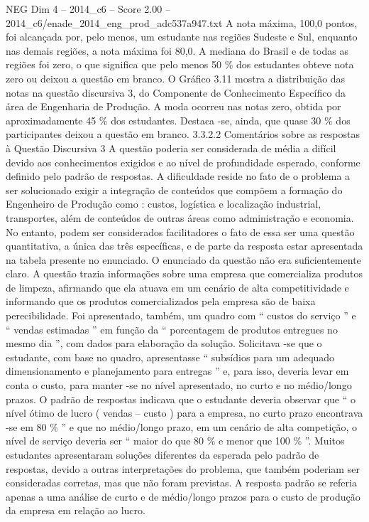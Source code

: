 \begin{textsample}{NEG Dim 4 – 2014\_c6 – Score 2.00 – 2014\_c6/enade\_2014\_eng\_prod\_adc537a947.txt}
A nota máxima, 100,0 pontos, foi alcançada por, pelo menos, um estudante nas regiões Sudeste e Sul, enquanto nas demais regiões, a nota máxima foi 80,0.
A mediana do Brasil e de todas as regiões foi zero, o que significa que pelo menos 50 \% dos estudantes obteve nota zero ou deixou a questão em branco.
O Gráfico 3.11 mostra a distribuição das notas na questão discursiva 3, do Componente de Conhecimento Específico da área de Engenharia de Produção.
A moda ocorreu nas notas zero, obtida por aproximadamente 45 \% dos estudantes.
Destaca -se, ainda, que quase 30 \% dos participantes deixou a questão em branco. 3.3.2.2 Comentários sobre as respostas à Questão Discursiva 3 A questão poderia ser considerada de média a difícil devido aos conhecimentos exigidos e ao nível de profundidade esperado, conforme definido pelo padrão de respostas.
A dificuldade reside no fato de o problema a ser solucionado exigir a integração de conteúdos que compõem a formação do Engenheiro de Produção como : custos, logística e localização industrial, transportes, além de conteúdos de outras áreas como administração e economia.
No entanto, podem ser considerados facilitadores o fato de essa ser uma questão quantitativa, a única das três específicas, e de parte da resposta estar apresentada na tabela presente no enunciado.
O enunciado da questão não era suficientemente claro.
A questão trazia informações sobre uma empresa que comercializa produtos de limpeza, afirmando que ela atuava em um cenário de alta competitividade e informando que os produtos comercializados pela empresa são de baixa perecibilidade.
Foi apresentado, também, um quadro com “ custos do serviço ” e “ vendas estimadas ” em função da “ porcentagem de produtos entregues no mesmo dia ”, com dados para elaboração da solução.
Solicitava -se que o estudante, com base no quadro, apresentasse “ subsídios para um adequado dimensionamento e planejamento para entregas ” e, para isso, deveria levar em conta o custo, para manter -se no nível apresentado, no curto e no médio/longo prazos.
O padrão de respostas indicava que o estudante deveria observar que “ o nível ótimo de lucro ( vendas – custo ) para a empresa, no curto prazo encontrava -se em 80 \% ” e que no médio/longo prazo, em um cenário de alta competição, o nível de serviço deveria ser “ maior do que 80 \% e menor que 100 \% ”.
Muitos estudantes apresentaram soluções diferentes da esperada pelo padrão de respostas, devido a outras interpretações do problema, que também poderiam ser consideradas corretas, mas que não foram previstas.
A resposta padrão se referia apenas a uma análise de curto e de médio/longo prazos para o custo de produção da empresa em relação ao lucro.

\end{textsample}
